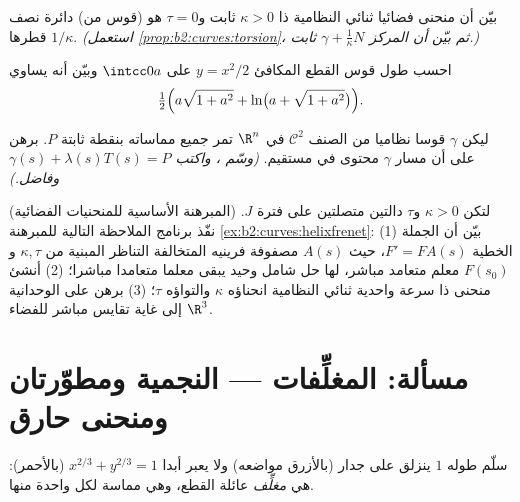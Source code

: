 \begin{exercise}[$\star\star\star$]\label{exo:b2:curves:9}
بيّن أن منحنى فضائيا ثنائي النظامية ذا $\kappa > 0$ ثابت و$\tau = 0$ هو (قوس
من) دائرة نصف قطرها $1/\kappa$. \emph{(استعمل \cref{prop:b2:curves:torsion}، ثم بيّن أن المركز
$\gamma + \frac1\kappa N$ ثابت.)}
\end{exercise}

\begin{exercise}[$\star$]\label{exo:b2:curves:10}
احسب طول قوس القطع المكافئ $y = x^2/2$ على $\intcc0a$ وبيّن أنه يساوي
\[
\tfrac12\Bigl(a\sqrt{1 + a^2} + \ln\bigl(a + \sqrt{1 +
a^2}\bigr)\Bigr).
\]
\end{exercise}

\begin{exercise}[$\star\star$]\label{exo:b2:curves:11}
ليكن $\gamma$ قوسا نظاميا من الصنف $\mathcal C^2$ في $\R^n$ تمر جميع مماساته
بنقطة ثابتة $P$. برهن على أن مسار $\gamma$ محتوى في مستقيم.
\emph{(وسّم ، واكتب $\gamma(s) +
\lambda(s)T(s) = P$ وفاضل.)}
\end{exercise}

\begin{exercise}[$\star\star\star$]\label{exo:b2:curves:12}
(المبرهنة الأساسية للمنحنيات الفضائية) لتكن $\kappa > 0$ و$\tau$ دالتين
متصلتين على فترة $J$. نفّذ برنامج الملاحظة التالية للمبرهنة
\cref{ex:b2:curves:helixfrenet}: (1) بيّن أن الجملة الخطية $F' = FA(s)$، حيث $A(s)$ مصفوفة فرينيه
المتخالفة التناظر المبنية من $\kappa, \tau$ و$F(s_0)$ معلم متعامد مباشر، لها
حل شامل وحيد يبقى معلما متعامدا مباشرا؛ (2) أنشئ منحنى ذا سرعة
واحدية ثنائي النظامية انحناؤه $\kappa$ والتواؤه $\tau$؛ (3) برهن على
الوحدانية إلى غاية تقايس مباشر للفضاء $\R^3$.
\end{exercise}

\section{مسألة: المغلِّفات --- النجمية ومطوّرتان ومنحنى حارق}

\begin{omfigure}

{\small سلّم طوله $1$ ينزلق على جدار (بالأزرق مواضعه) ولا يعبر
أبدا  $x^{2/3} + y^{2/3} = 1$ (بالأحمر):  هي \emph{مغلِّف} عائلة
القطع، وهي مماسة لكل واحدة منها.}
\end{omfigure}

